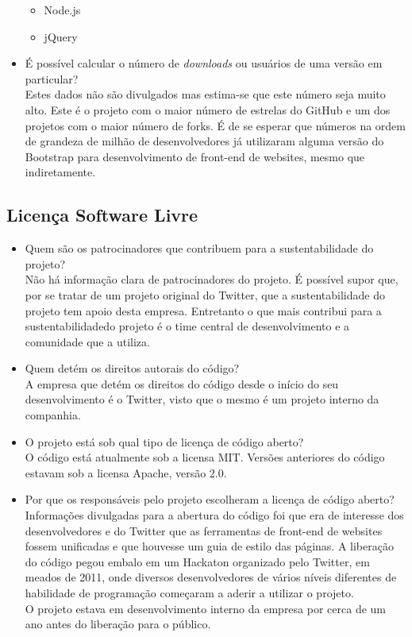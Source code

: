 \documentclass[12pt,a4paper]{article} %
\begin{document}
\begin{itemize}
\begin{itemize}
	\item Node.js
	\item jQuery
	\end{itemize}
\item É possível calcular o número de \textit{downloads} ou usuários de uma versão em particular?\\
	Estes dados não são divulgados mas estima-se que este número seja muito alto. Este é o projeto com o maior número de estrelas do GitHub e um dos projetos com o maior número de forks. É de se esperar que números na ordem de grandeza de milhão de desenvolvedores já utilizaram alguma versão do Bootstrap para desenvolvimento de front-end de websites, mesmo que indiretamente.
\end{itemize}

\subsection{Licença Software Livre}


\begin{itemize}
\item Quem são os patrocinadores que contribuem para a sustentabilidade do projeto?\\
	Não há informação clara de patrocinadores do projeto. É possível supor que, por se tratar de um projeto original do Twitter, que a sustentabilidade do projeto tem apoio desta empresa. Entretanto o que mais contribui para a sustentabilidadedo projeto é o time central de desenvolvimento e a comunidade que a utiliza.

\item Quem detém os direitos autorais do código?\\
	A empresa que detém os direitos do código desde o início do seu desenvolvimento é o Twitter, visto que o mesmo é um projeto interno da companhia.	
	
\item O projeto está sob qual tipo de licença de código aberto?\\
	O código está atualmente sob a licensa MIT. Versões anteriores do código estavam sob a licensa Apache, versão 2.0.
\item Por que os responsáveis pelo projeto escolheram a licença de código aberto?\\
	Informações divulgadas para a abertura do código foi que era de interesse dos desenvolvedores e do Twitter que as ferramentas de front-end de websites fossem unificadas e que houvesse um guia de estilo das páginas. A liberação do código pegou embalo em um Hackaton organizado pelo Twitter, em meados de 2011, onde diversos desenvolvedores de vários níveis diferentes de habilidade de programação começaram a aderir a utilizar o projeto.\\
	 O projeto estava em desenvolvimento interno da empresa por cerca de um ano antes do liberação para o público.
\end{itemize}
\end{document}
